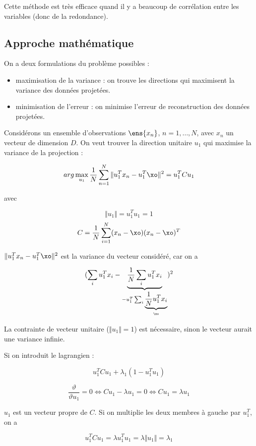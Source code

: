 		
	
	Cette méthode est très efficace quand il y a beaucoup de corrélation entre les variables (donc de la redondance).
	
	
	\subsection{Approche mathématique}
	
	On a deux formulations du problème possibles :
	
	\begin{itemize}
		\item maximisation de la variance : on trouve les directions qui maximisent la variance des données projetées.
		\item minimisation de l'erreur : on minimise l'erreur de reconstruction des données projetées.
	\end{itemize}
	
	Considérons un ensemble d'observations $\ens{x_n}$, $n = 1, \dots , N$, avec $x_n$ un vecteur de dimension $D$. On veut trouver la direction unitaire $u_1$ qui maximise la variance de la projection :
	
	$$arg \max_{u_1} \frac{1}{N} \sum_{n = 1}^N \Vert u_1^T x_n - u_1^T \xo \Vert^2 = u_1^TCu_1$$
	
	avec
	
	$$\Vert u_1 \Vert = u_1^Tu_1 = 1$$
	$$C = \frac{1}{N} \sum_{i = 1}^N (x_n - \xo)(x_n - \xo)^T$$
	
	$\Vert u_1^T x_n - u_1^T \xo \Vert^2$ est la variance du vecteur considéré, car on a
	
	$$(\sum_i u_1^Tx_i - \underbrace{\frac{1}{N} \sum_i u_1^Tx_i}_{-u_1^T\sum_i \underbrace{\frac{1}{N} u_1^Tx_i}_{\xo}})^2$$
	
	La contrainte de vecteur unitaire ($\Vert u_1 \Vert = 1$) est nécessaire, sinon le vecteur aurait une variance infinie.
	
	Si on introduit le lagrangien :
	
	$$u_1^T Cu_1 + \lambda_1(1 - u_1^Tu_1)$$
	
	$$\frac{\vartheta}{\vartheta u_1} = 0 \Leftrightarrow Cu_1 - \lambda u_1 = 0 \Leftrightarrow Cu_1 = \lambda u_1$$
	
	$u_1$ est un vecteur propre de $C$. Si on multiplie les deux membres à gauche par $u_1^T$, on a
	
	$$u_1^TCu_1 = \lambda u_1^Tu_1 = \lambda \Vert u_1 \Vert = \lambda_1$$
	
